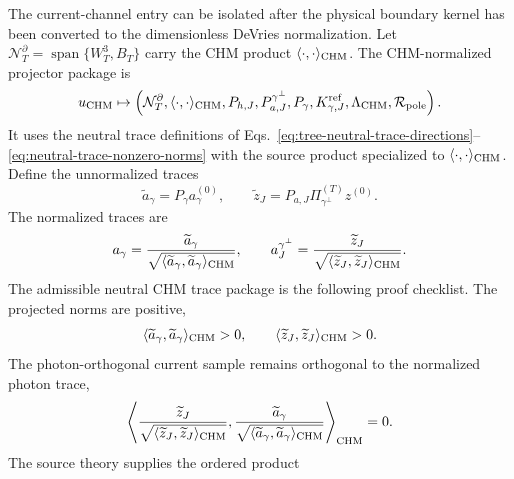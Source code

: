 \begin{widetext}
The current-channel entry can be isolated after the physical boundary kernel
has been converted to the dimensionless DeVries normalization.  Let
\(\mathcal N_T^\partial=\operatorname{span}\{W^3_T,B_T\}\) carry the CHM
product \(\langle\cdot,\cdot\rangle_{\rm CHM}\).  The CHM-normalized projector
package is
\begin{equation}
  u_{\rm CHM}\mapsto
  \left(
  \mathcal N_T^\partial,\langle\cdot,\cdot\rangle_{\rm CHM},
  P_{h,J},P_{a,J}^{\gamma^\perp},P_\gamma,
  K_{\gamma,J}^{\rm ref},\Lambda_{\rm CHM},\mathcal R_{\rm pole}
  \right).
  \label{eq:chm-normalized-projector-package}
\end{equation}
It uses the neutral trace definitions of
Eqs.~\eqref{eq:tree-neutral-trace-directions}--\eqref{eq:neutral-trace-nonzero-norms}
with the source product specialized to \(\langle\cdot,\cdot\rangle_{\rm CHM}\).
Define the unnormalized traces
\begin{equation}
  \widetilde a_\gamma=P_\gamma a_\gamma^{(0)},\qquad
  \widetilde z_J=P_{a,J}\Pi_{\gamma^\perp}^{(T)}z^{(0)} .
  \label{eq:chm-trace-tilde-definitions}
\end{equation}
The normalized traces are
\begin{equation}
  a_\gamma=
  \frac{\widetilde a_\gamma}
  {\sqrt{\langle\widetilde a_\gamma,
  \widetilde a_\gamma\rangle_{\rm CHM}}},
  \qquad
  a_J^{\gamma^\perp}
  =
  \frac{\widetilde z_J}
  {\sqrt{\langle\widetilde z_J,\widetilde z_J\rangle_{\rm CHM}}}.
  \label{eq:chm-source-normalized-neutral-traces}
\end{equation}
The admissible neutral CHM trace package is the following proof checklist.  The
projected norms are positive,
\begin{equation}
  \langle\widetilde a_\gamma,\widetilde a_\gamma\rangle_{\rm CHM}>0,
  \qquad
  \langle\widetilde z_J,\widetilde z_J\rangle_{\rm CHM}>0.
  \label{eq:chm-admissible-positive-norms}
\end{equation}
The photon-orthogonal current sample remains orthogonal to the normalized photon
trace,
\begin{equation}
  \left\langle
  \frac{\widetilde z_J}
  {\sqrt{\langle\widetilde z_J,\widetilde z_J\rangle_{\rm CHM}}},
  \frac{\widetilde a_\gamma}
  {\sqrt{\langle\widetilde a_\gamma,\widetilde a_\gamma\rangle_{\rm CHM}}}
  \right\rangle_{\rm CHM}
  =
  0.
  \label{eq:chm-admissible-orthogonality}
\end{equation}
The source theory supplies the ordered product

\end{widetext}
